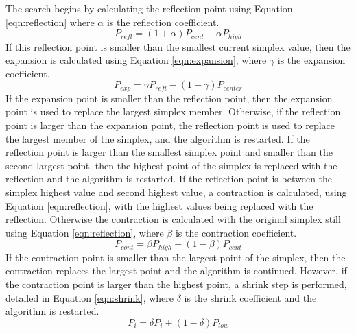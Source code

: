 The search begins by calculating the reflection point using Equation \ref{eqn:reflection} where $\alpha$ is the reflection coefficient.
	\begin{equation}\label{eqn:reflection}
		P_{refl} = (1 + \alpha) P_{cent} - \alpha P_{high}
	\end{equation}
If this reflection point is smaller than the smallest current simplex value, then the expansion is calculated using Equation \ref{eqn:expansion}, where $\gamma$ is the expansion coefficient.
	\begin{equation}\label{eqn:expansion}
		P_{exp} = \gamma P_{refl} - (1 - \gamma) P_{center}
	\end{equation}
If the expansion point is smaller than the reflection point, then the expansion point is used to replace the largest simplex member.  Otherwise, if the reflection point is larger than the expansion point, the reflection point is used to replace the largest member of the simplex, and the algorithm is restarted.
If the reflection point is larger than the smallest simplex point and smaller than the second largest point, then the highest point of the simplex is replaced with the reflection and the algorithm is restarted. 
If the reflection point is between the simplex highest value and second highest value, a contraction is calculated, using Equation \ref{eqn:reflection}, with the highest values being replaced with the reflection.  Otherwise the contraction is calculated with the original simplex still using Equation \ref{eqn:reflection}, where $\beta$ is the contraction coefficient.
	\begin{equation}\label{eqn:contraction}
		P_{cont} = \beta P_{high} - (1 - \beta) P_{cent}	
	\end{equation}
If the contraction point is smaller than the largest point of the simplex, then the contraction replaces the largest point and the algorithm is continued.
However, if the contraction point is larger than the highest point, a shrink step is performed, detailed in Equation \ref{eqn:shrink}, where $\delta$ is the shrink coefficient and the algorithm is restarted.
	\begin{equation}\label{eqn:shrink}
		P_{i} = \delta P_{i} + (1 - \delta) P_{low}
	\end{equation}